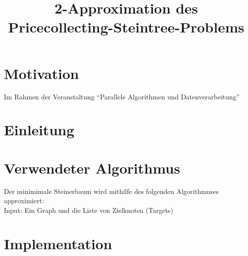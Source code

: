 \documentclass[a4paper,10pt]{article}
\title{2-Approximation des Pricecollecting-Steintree-Problems}
\author{}
\begin{document}
\maketitle

\begin{abstract}

\end{abstract}

\section{Motivation}
Im Rahmen der Veranstaltung ``Parallele Algorithmen und Datenverarbeitung''

\section{Einleitung}

\section{Verwendeter Algorithmus}
\label{sec:mst}
Der minimimale Steinerbaum wird mithilfe des folgenden Algorithmuses approximiert:\\
Input: Ein Graph und die Liste von Zielknoten (Targets)\\

\section{Implementation}
\end{document}
